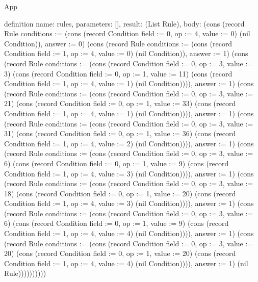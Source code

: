 \begin{lexlean}{App}
\begin{semanticmodule}
definition{
  name: rules,
  parameters: [],
  result: (List Rule),
  body: (cons (record Rule {conditions := (cons (record Condition {field := 0, op := 4, value := 0}) (nil Condition)), answer := 0}) (cons (record Rule {conditions := (cons (record Condition {field := 1, op := 4, value := 0}) (nil Condition)), answer := 1}) (cons (record Rule {conditions := (cons (record Condition {field := 0, op := 3, value := 3}) (cons (record Condition {field := 0, op := 1, value := 11}) (cons (record Condition {field := 1, op := 4, value := 1}) (nil Condition)))), answer := 1}) (cons (record Rule {conditions := (cons (record Condition {field := 0, op := 3, value := 21}) (cons (record Condition {field := 0, op := 1, value := 33}) (cons (record Condition {field := 1, op := 4, value := 1}) (nil Condition)))), answer := 1}) (cons (record Rule {conditions := (cons (record Condition {field := 0, op := 3, value := 31}) (cons (record Condition {field := 0, op := 1, value := 36}) (cons (record Condition {field := 1, op := 4, value := 2}) (nil Condition)))), answer := 1}) (cons (record Rule {conditions := (cons (record Condition {field := 0, op := 3, value := 6}) (cons (record Condition {field := 0, op := 1, value := 9}) (cons (record Condition {field := 1, op := 4, value := 3}) (nil Condition)))), answer := 1}) (cons (record Rule {conditions := (cons (record Condition {field := 0, op := 3, value := 18}) (cons (record Condition {field := 0, op := 1, value := 20}) (cons (record Condition {field := 1, op := 4, value := 3}) (nil Condition)))), answer := 1}) (cons (record Rule {conditions := (cons (record Condition {field := 0, op := 3, value := 6}) (cons (record Condition {field := 0, op := 1, value := 9}) (cons (record Condition {field := 1, op := 4, value := 4}) (nil Condition)))), answer := 1}) (cons (record Rule {conditions := (cons (record Condition {field := 0, op := 3, value := 20}) (cons (record Condition {field := 0, op := 1, value := 20}) (cons (record Condition {field := 1, op := 4, value := 4}) (nil Condition)))), answer := 1}) (nil Rule))))))))))
}


\end{semanticmodule}
\end{lexlean}

